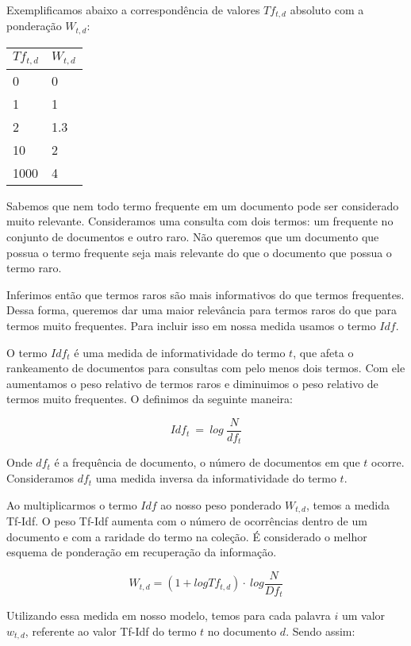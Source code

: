 \documentclass[a4paper,12pt]{article}
\begin{document}
 
 Exemplificamos abaixo a correspondência de valores $Tf_{t,d}$ absoluto com a ponderação $W_{t,d}$:
 
 \begin{center}
  \begin{tabular}{ll}
    \hline
    $Tf_{t,d}$ & $W_{t,d}$\\
    \hline
    0&0\\
    1&1\\
    2&1.3\\
    10&2\\
    1000&4\\
    
  \end{tabular}
 \end{center}
 
 
  Sabemos que nem todo termo frequente em um documento pode ser considerado muito relevante. Consideramos uma consulta com dois termos:
  um frequente no conjunto de documentos e outro raro. Não queremos que um documento que possua o termo frequente seja mais relevante do que o
  documento que possua o termo raro.

  Inferimos então que termos raros são mais informativos do que termos frequentes. Dessa forma, queremos dar uma maior relevância para
  termos raros do que para termos muito frequentes. Para incluir isso em nossa medida usamos o termo $Idf$.
  
  O termo $Idf_{t}$ é uma medida de informatividade do termo $t$, que afeta o rankeamento de documentos para consultas com pelo menos dois
  termos. Com ele aumentamos o peso relativo de termos raros e diminuimos o peso relativo
  de termos muito frequentes. O definimos da seguinte maneira:
  
  $$ Idf_{t}\ = \ log\ \frac{N}{df_{t}}$$
  
  Onde $df_{t}$ é a frequência de documento, o número de documentos em que $t$ ocorre. Consideramos $df_{t}$ uma medida inversa da informatividade
  do termo $t$.
  
  Ao multiplicarmos o termo $Idf$ ao nosso peso ponderado $W_{t,d}$, temos a medida Tf-Idf. O peso Tf-Idf aumenta com o número de ocorrências
  dentro de um documento e com a raridade do termo na coleção. É considerado o melhor esquema de ponderação em recuperação da informação.
  
  $$ W_{t,d} = (1 + log Tf_{t,d}) \cdot \ log \dfrac{N}{Df_{t}}$$


 Utilizando essa medida em nosso modelo, temos para cada palavra $i$ um valor $w_{t,d}$, referente
  ao valor Tf-Idf do termo $t$ no documento $d$. Sendo assim:
  
\end{document}
